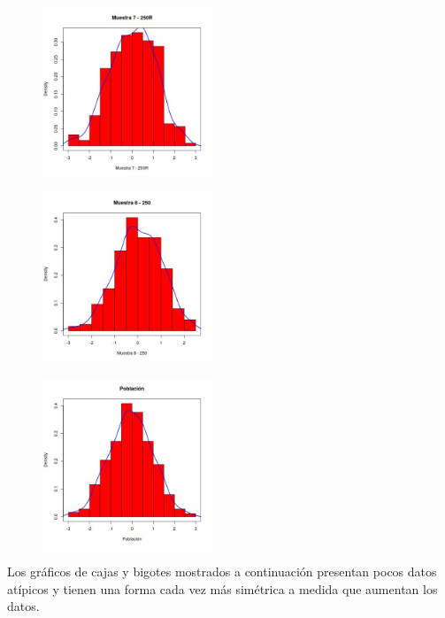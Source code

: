 \documentclass[a4paper,10pt,twocolumn]{report}
\begin{document}
	\begin{figure}[H]
		\centering
		\includegraphics[width=0.45\textwidth]{img/ex2/Histograms/Histogram7.jpeg}
		\label{hist:2.7}	
	\end{figure}

	\begin{figure}[H]
		\centering
		\includegraphics[width=0.45\textwidth]{img/ex2/Histograms/Histogram8.jpeg}
		\label{hist:2.8}	
	\end{figure}

	\begin{figure}[H]
		\centering
		\includegraphics[width=0.45\textwidth]{img/ex2/Histograms/HistogramPop.jpeg}
		\label{hist:2.9}	
	\end{figure}
	

	Los gráficos de cajas y bigotes mostrados a continuación presentan pocos datos atípicos y tienen una forma cada vez más simétrica a medida que aumentan los datos.
	
\end{document}
